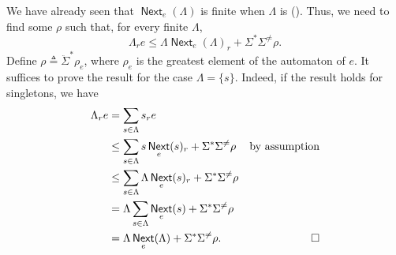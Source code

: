 \documentclass[11pt,a4paper]{amsart}
\theoremstyle{definition}
\DeclareMathOperator{\Next}{\mathsf{Next}}
\begin{document}
\begin{proofEnd}
  We have already seen that $\Next_e( \Lambda )$ is finite when $ \Lambda $ is
  ().  Thus, we need to find some $ \rho $ such that, for every
  finite $ \Lambda $,
  \[  \Lambda _re  \leq   \Lambda \Next_e( \Lambda )_r +  \Sigma ^* \Sigma ^{ \neq } \rho . \] Define $ \rho   \triangleq  \ddot{ \Sigma }^* \rho _e$, where
  $ \rho _e$ is the greatest element of the automaton of $e$. It suffices to prove
  the result for the case $ \Lambda  = \{s\}$.  Indeed, if the result holds for
  singletons, we have
  \begin{align*}
     \Lambda _re
    & =  \sum _{s  \in   \Lambda } s_re \\
    &  \leq   \sum _{s  \in   \Lambda } s\Next_e(s)_r +  \Sigma ^* \Sigma ^{ \neq } \rho 
    & \text{by assumption} \\
    &  \leq   \sum _{s  \in   \Lambda }  \Lambda \Next_e(s)_r +  \Sigma ^* \Sigma ^{ \neq } \rho  \\
    & =  \Lambda  \sum _{s  \in   \Lambda }\Next_e(s) +  \Sigma ^* \Sigma ^{ \neq } \rho  \\
    & =  \Lambda \Next_e( \Lambda ) +  \Sigma ^* \Sigma ^{ \neq } \rho .  & \qedhere
  \end{align*}


\end{proofEnd}
\end{document}
